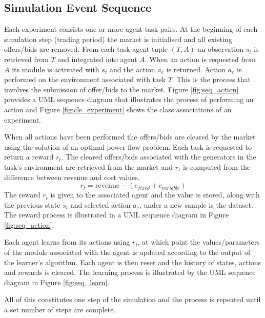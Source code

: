 \subsection{Simulation Event Sequence}

Each experiment consists one or more agent-task pairs. At the beginning of each
simulation step (trading period) the market is initialised and all existing
offers/bids are removed.  From each task-agent tuple $(T,A)$ an observation
$s_t$ is retrieved from $T$ and integrated into agent $A$.  When an action is
requested from $A$ its module is activated with $s_t$ and the action $a_e$ is
returned.  Action $a_e$ is performed on the environment associated with task
$T$.  This is the process that involves the submission of offer/bids to the
market.  Figure \ref{fig:seq_action} provides a UML sequence diagram that
illustrates the process of performing an action and Figure
\ref{fig:cls_experiment} shows the class associations of an experiment.




When all actions have been performed the offers/bids are cleared by the
market using the solution of an optimal power flow problem.  Each task is
requested to return a reward $r_t$.  The cleared offers/bids associated with
the generators in the task's environment are retrieved from the market
and $r_t$ is computed from the difference between revenue and cost values.
\begin{equation}
r_t = \mbox{revenue} - (c_{fixed} + c_{variable})
\end{equation}
The reward $r_t$ is given to the associated agent and the value is stored,
along with the previous state $s_t$ and selected action $a_e$, under a new
sample is the dataset.  The reward process is illustrated in a UML sequence
diagram in Figure \ref{fig:seq_action}.



Each agent learns from its actions using $r_t$, at which point the
values/parameters of the module associated with the agent is updated according
to the output of the learner's algorithm.  Each agent is then reset and the
history of states, actions and rewards is cleared.  The learning process is
illustrated by the UML sequence diagram in  Figure \ref{fig:seq_learn}.

All of this constitutes one step of the simulation and the process is
repeated until a set number of steps are complete.

